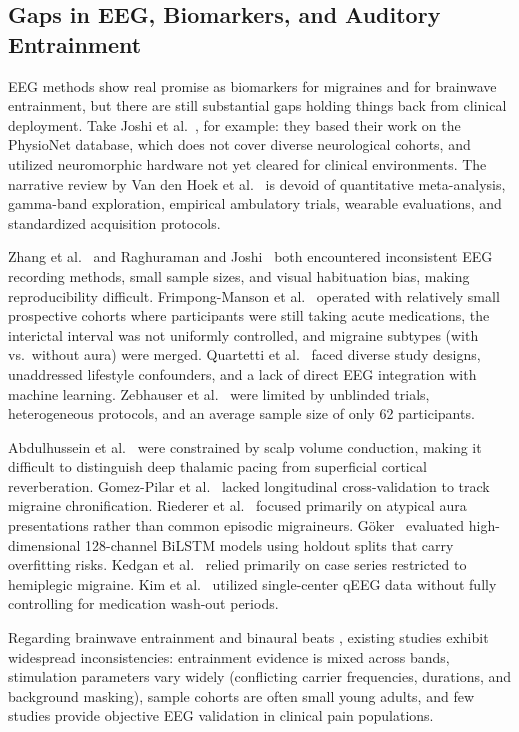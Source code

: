 \documentclass[12pt, a4paper]{report}
\begin{document}
\subsection{Gaps in EEG, Biomarkers, and Auditory Entrainment}
EEG methods show real promise as biomarkers for migraines and for brainwave entrainment, but there are still substantial gaps holding things back from clinical deployment. Take Joshi et al.~\cite{JoshiMatharu2025}, for example: they based their work on the PhysioNet database, which does not cover diverse neurological cohorts, and utilized neuromorphic hardware not yet cleared for clinical environments. The narrative review by Van den Hoek et al.~\cite{VanDenHoek2024} is devoid of quantitative meta-analysis, gamma-band exploration, empirical ambulatory trials, wearable evaluations, and standardized acquisition protocols.

Zhang et al.~\cite{Zhang2023} and Raghuraman and Joshi~\cite{RaghuramanJoshi2024} both encountered inconsistent EEG recording methods, small sample sizes, and visual habituation bias, making reproducibility difficult. Frimpong-Manson et al.~\cite{FrimpongManson2024} operated with relatively small prospective cohorts where participants were still taking acute medications, the interictal interval was not uniformly controlled, and migraine subtypes (with vs.\ without aura) were merged. Quartetti et al.~\cite{Quartetti2025} faced diverse study designs, unaddressed lifestyle confounders, and a lack of direct EEG integration with machine learning. Zebhauser et al.~\cite{Zebhauser2024} were limited by unblinded trials, heterogeneous protocols, and an average sample size of only 62 participants.

Abdulhussein et al.~\cite{AbdulhusseinAldeen2024} were constrained by scalp volume conduction, making it difficult to distinguish deep thalamic pacing from superficial cortical reverberation. Gomez-Pilar et al.~\cite{GomezPilar2022} lacked longitudinal cross-validation to track migraine chronification. Riederer et al.~\cite{Riederer2023} focused primarily on atypical aura presentations rather than common episodic migraineurs. Göker~\cite{Goker2023} evaluated high-dimensional 128-channel BiLSTM models using holdout splits that carry overfitting risks. Kedgan et al.~\cite{Kedgan2025} relied primarily on case series restricted to hemiplegic migraine. Kim et al.~\cite{Kim2023} utilized single-center qEEG data without fully controlling for medication wash-out periods.

Regarding brainwave entrainment and binaural beats \cite{Melnichuk2025,Yang2025,Xiong2025,KahathuduwaBlume2025,Shamsi2024,Sudre2024,Ingendoh2023,Fan2024,Mosheshe2024,ChockboondeeJatupornpoonsub2023,Dabiri2022,CoronaGonzalez2021,AlShargie2022,WangZhang2022,BasuBanerjee2023,Hamid2025}, existing studies exhibit widespread inconsistencies: entrainment evidence is mixed across bands, stimulation parameters vary widely (conflicting carrier frequencies, durations, and background masking), sample cohorts are often small young adults, and few studies provide objective EEG validation in clinical pain populations.
\end{document}
